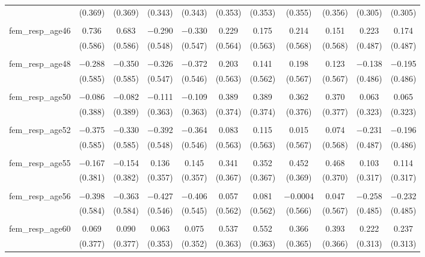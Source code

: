 \begin{table}[!htbp]
\begin{tabular}{@{\extracolsep{5pt}}lcccccccccc}
  & (0.369) & (0.369) & (0.343) & (0.343) & (0.353) & (0.353) & (0.355) & (0.356) & (0.305) & (0.305) \\ 
  & & & & & & & & & & \\ 
 fem\_resp\_age46 & 0.736 & 0.683 & $-$0.290 & $-$0.330 & 0.229 & 0.175 & 0.214 & 0.151 & 0.223 & 0.174 \\ 
  & (0.586) & (0.586) & (0.548) & (0.547) & (0.564) & (0.563) & (0.568) & (0.568) & (0.487) & (0.487) \\ 
  & & & & & & & & & & \\ 
 fem\_resp\_age48 & $-$0.288 & $-$0.350 & $-$0.326 & $-$0.372 & 0.203 & 0.141 & 0.198 & 0.123 & $-$0.138 & $-$0.195 \\ 
  & (0.585) & (0.585) & (0.547) & (0.546) & (0.563) & (0.562) & (0.567) & (0.567) & (0.486) & (0.486) \\ 
  & & & & & & & & & & \\ 
 fem\_resp\_age50 & $-$0.086 & $-$0.082 & $-$0.111 & $-$0.109 & 0.389 & 0.389 & 0.362 & 0.370 & 0.063 & 0.065 \\ 
  & (0.388) & (0.389) & (0.363) & (0.363) & (0.374) & (0.374) & (0.376) & (0.377) & (0.323) & (0.323) \\ 
  & & & & & & & & & & \\ 
 fem\_resp\_age52 & $-$0.375 & $-$0.330 & $-$0.392 & $-$0.364 & 0.083 & 0.115 & 0.015 & 0.074 & $-$0.231 & $-$0.196 \\ 
  & (0.585) & (0.585) & (0.548) & (0.546) & (0.563) & (0.563) & (0.567) & (0.568) & (0.487) & (0.486) \\ 
  & & & & & & & & & & \\ 
 fem\_resp\_age55 & $-$0.167 & $-$0.154 & 0.136 & 0.145 & 0.341 & 0.352 & 0.452 & 0.468 & 0.103 & 0.114 \\ 
  & (0.381) & (0.382) & (0.357) & (0.357) & (0.367) & (0.367) & (0.369) & (0.370) & (0.317) & (0.317) \\ 
  & & & & & & & & & & \\ 
 fem\_resp\_age56 & $-$0.398 & $-$0.363 & $-$0.427 & $-$0.406 & 0.057 & 0.081 & $-$0.0004 & 0.047 & $-$0.258 & $-$0.232 \\ 
  & (0.584) & (0.584) & (0.546) & (0.545) & (0.562) & (0.562) & (0.566) & (0.567) & (0.485) & (0.485) \\ 
  & & & & & & & & & & \\ 
 fem\_resp\_age60 & 0.069 & 0.090 & 0.063 & 0.075 & 0.537 & 0.552 & 0.366 & 0.393 & 0.222 & 0.237 \\ 
  & (0.377) & (0.377) & (0.353) & (0.352) & (0.363) & (0.363) & (0.365) & (0.366) & (0.313) & (0.313) \\ 

\end{tabular}
\end{table}
